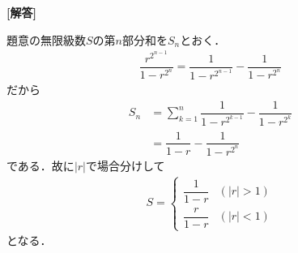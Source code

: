 \documentclass[../../main.tex]{subfiles}
\begin{document}
\begin{oframed}
  
\end{oframed}

{\bf [解答]}

題意の無限級数$S$の第$n$部分和を$S_n$とおく．
\begin{align}
  \dfrac{r^{2^{n-1}}}{1-r^{2^n}}=\dfrac{1}{1-r^{2^{n-1}}}-%
  \dfrac{1}{1-r^{2^n}}
\end{align}
だから
\begin{align}
  S_n&=\sum_{k=1}^n\dfrac{1}{1-r^{2^{k-1}}}-\dfrac{1}{1-r^{2^k}} \\
  &=\dfrac{1}{1-r}-\dfrac{1}{1-r^{2^n}}
\end{align}
である．故に$|r|$で場合分けして
\begin{align}
  S=\left\{
    \begin{array}{ll}
      \dfrac{1}{1-r} & (|r|>1) \\
      \dfrac{r}{1-r}  & (|r|<1)
    \end{array}
    \right.\tag{答}
  \end{align}
  となる．
  \newpage
  
\end{document}
